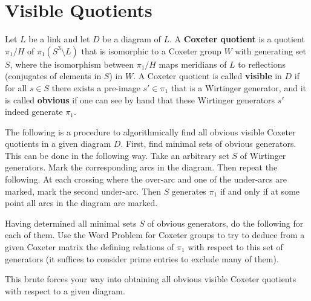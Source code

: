 \documentclass{article}
\begin{document}
\section{Visible Quotients}
Let $L$ be a link and let $D$ be a diagram of $L$.
A \textbf{Coxeter quotient} is a quotient $\pi_1/H$ of $\pi_1(S^3 \setminus L)$ that is isomorphic to a Coxeter group $W$ with generating set $S$, where the isomorphism between $\pi_1/H$ maps meridians of $L$ to reflections (conjugates of elements in $S$) in $W$. A Coxeter quotient is called \textbf{visible} in $D$ if for all $s \in S$ there exists a pre-image $s' \in \pi_1$ that is a Wirtinger generator, and it is called \textbf{obvious} if one can see by hand that these Wirtinger generators $s'$ indeed generate $\pi_1$.

The following is a procedure to algorithmically find all obvious visible Coxeter quotients in a given diagram $D$. First, find minimal sets of obvious generators. This can be done in the following way. Take an arbitrary set $S$ of Wirtinger generators. Mark the corresponding arcs in the diagram. Then repeat the following. At each crossing where the over-arc and one of the under-arcs are marked, mark the second under-arc. Then $S$ generates $\pi_1$ if and only if at some point all arcs in the diagram are marked.

Having determined all minimal sets $S$ of obvious generators, do the following for each of them. Use the Word Problem for Coxeter groups to try to deduce from a given Coxeter matrix the defining relations of $\pi_1$ with respect to this set of generators (it suffices to consider prime entries to exclude many of them). 

This brute forces your way into obtaining all obvious visible Coxeter quotients with respect to a given diagram.
\end{document}
